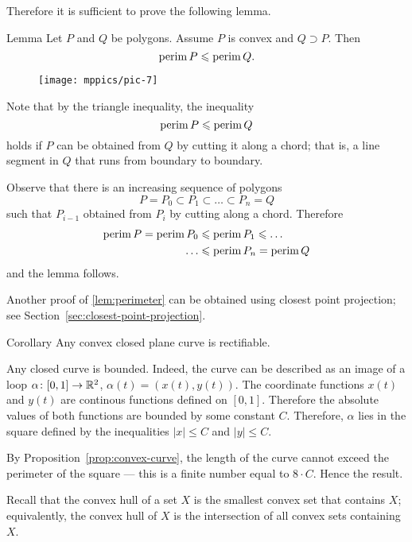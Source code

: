 Therefore it is sufficient to prove the following lemma.


\begin{thm}{Lemma}\label{lem:perimeter}
Let $P$ and $Q$ be polygons.
Assume $P$ is convex and $Q\supset P$.
Then 
\[\mathop{\rm perim}\nolimits P\leqslant \mathop{\rm perim}\nolimits Q.\]

\end{thm}


\begin{wrapfigure}{o}{24 mm}
\vskip3mm
\centering
\texttt{[image: mppics/pic-7]}
\vskip3mm
\end{wrapfigure}

Note that by the triangle inequality,
the inequality
\[\mathop{\rm perim}\nolimits P\leqslant \mathop{\rm perim}\nolimits Q\]
holds
if $P$ can be obtained from $Q$ by cutting it along a chord;
that is, a line segment in $Q$ that runs from boundary to boundary.

Observe that there is an increasing sequence of polygons 
$$P=P_0\subset P_1\subset\dots\subset P_n=Q$$
such that $P_{i-1}$ obtained from $P_{i}$ by cutting along a chord.
Therefore 
\begin{align*}
\mathop{\rm perim}\nolimits P=\mathop{\rm perim}\nolimits P_0&\leqslant\mathop{\rm perim}\nolimits P_1\leqslant\dots
\\
\dots&\leqslant\mathop{\rm perim}\nolimits P_n=\mathop{\rm perim}\nolimits Q
\end{align*}
and the lemma follows.
\qeds

Another proof of \ref{lem:perimeter} can be obtained using closest point projection; see Section~\ref{sec:closest-point-projection}.  

\begin{thm}{Corollary}\label{cor:convex=>rectifiable}
Any convex closed plane curve is rectifiable.  
\end{thm}

Any closed curve is bounded.
Indeed, the curve can be described as an image of a loop $\alpha\colon[0,1]\to\mathbb{R}^2$, $\alpha(t)=(x(t),y(t))$.
The coordinate functions $x(t)$ and $y(t)$ are continous functions defined on $[0,1]$.
Therefore the absolute values of both functions are bounded by some constant $C$.
Therefore, $\alpha$ lies in the square defined by the inequalities $|x|\le C$ and $|y|\le C$.


By Proposition~\ref{prop:convex-curve}, the length of the curve cannot exceed the perimeter of the square --- this is a finite number equal to $8\cdot C$. 
Hence the result.
\qeds

Recall that the convex hull of a set $X$ is the smallest convex set that contains $X$; equivalently, the convex hull of $X$ is the intersection of all convex sets containing $X$.

